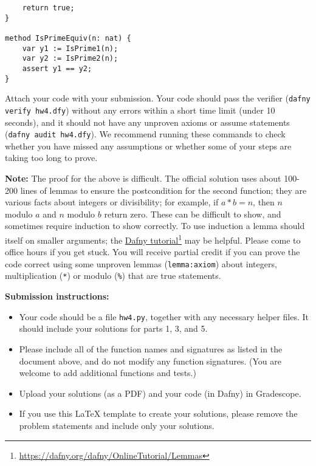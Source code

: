\documentclass{article}
\newcommand{\visiblehref}[2]{\href{#1}{#2}\footnote{\url{#1}}}
\begin{document}
\begin{enumerate}
\begin{verbatim}
    return true;
}

method IsPrimeEquiv(n: nat) {
    var y1 := IsPrime1(n);
    var y2 := IsPrime2(n);
    assert y1 == y2;
}
\end{verbatim}

Attach your code with your submission.
Your code should pass the verifier (\texttt{dafny verify hw4.dfy}) without any errors
within a short time limit (under 10 seconds),
and it should not have any unproven axioms or assume statements (\texttt{dafny audit hw4.dfy}).
We recommend running these commands to check whether you have missed any assumptions or whether some of your steps are taking too long to prove.

\textbf{Note:}
The proof for the above is difficult.
The official solution uses about 100-200 lines of lemmas
to ensure the postcondition for the second function;
they are various facts about integers or divisibility;
for example, if $a * b = n$, then $n$ modulo $a$ and $n$ modulo $b$ return zero.
These can be difficult to show, and sometimes require induction to show correctly.
To use induction a lemma should itself on smaller arguments; the \visiblehref{https://dafny.org/dafny/OnlineTutorial/Lemmas}{Dafny tutorial} may be helpful.
Please come to office hours if you get stuck.
You will receive partial credit if you can prove the code correct using some unproven lemmas (\texttt{lemma{:axiom}}) about integers, multiplication (\texttt{*}) or modulo (\texttt{\%}) that are true statements.

\end{enumerate}

\noindent
\textbf{Submission instructions:}
\begin{itemize}
\item Your code should be a file \texttt{hw4.py}, together with any necessary helper files.
It should include your solutions for parts 1, 3, and 5.
\item Please include all of the function names and signatures as listed in the document above,
and do not modify any function signatures. (You are welcome to add additional functions and tests.)
\item Upload your solutions (as a PDF) and your code (in Dafny) in Gradescope.
\item If you use this LaTeX template to create your solutions, please remove the problem statements and include only your solutions.
\end{itemize}
\end{document}
